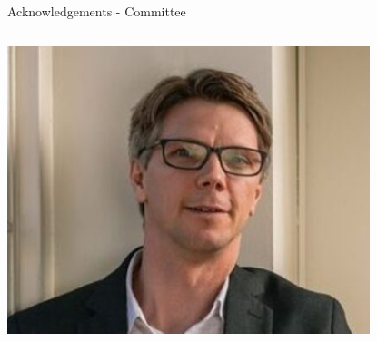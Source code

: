 \documentclass[aspectratio=169]{beamer}
\begin{document}
\begin{frame}{Acknowledgements - Committee}
\begin{columns}
            \includegraphics[width=0.95\textwidth]{people/milnergroup/detmold.png}
    \end{columns}            
\end{frame}
\end{document}
